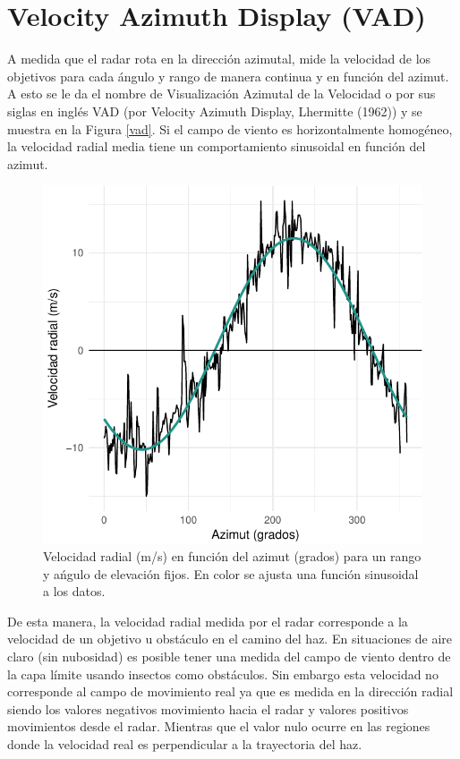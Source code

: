 \documentclass[12pt,spanish,oneside]{book}
\begin{document}
\section{Velocity Azimuth Display
(VAD)}\label{velocity-azimuth-display-vad}

A medida que el radar rota en la dirección azimutal, mide la velocidad
de los objetivos para cada ángulo y rango de manera continua y en
función del azimut. A esto se le da el nombre de Visualización Azimutal
de la Velocidad o por sus siglas en inglés VAD (por Velocity Azimuth
Display, Lhermitte (1962)) y se muestra en la Figura \ref{vad}. Si el
campo de viento es horizontalmente homogéneo, la velocidad radial media
tiene un comportamiento sinusoidal en función del azimut.

\begin{figure}

{\centering \includegraphics{Tesis_files/figure-latex/vad-1} 

}

\caption{Velocidad radial (m/s) en función del azimut (grados) para un rango y ańgulo de elevación fijos. En color se  ajusta una función sinusoidal a los datos. \label{vad}}\label{fig:vad}
\end{figure}

De esta manera, la velocidad radial medida por el radar corresponde a la
velocidad de un objetivo u obstáculo en el camino del haz. En
situaciones de aire claro (sin nubosidad) es posible tener una medida
del campo de viento dentro de la capa límite usando insectos como
obstáculos. Sin embargo esta velocidad no corresponde al campo de
movimiento real ya que es medida en la dirección radial siendo los
valores negativos movimiento hacia el radar y valores positivos
movimientos desde el radar. Mientras que el valor nulo ocurre en las
regiones donde la velocidad real es perpendicular a la trayectoria del
haz.
\end{document}
